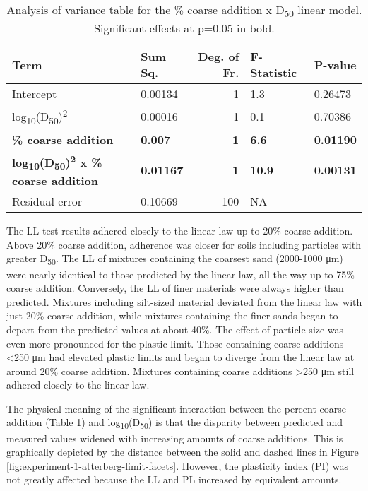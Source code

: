 \documentclass[
  letterpaper,
]{article}
\begin{document}
\begin{table}

\caption{\label{tab:experiment-1-d50-ANOVA}Analysis of variance table for the \% coarse addition x D\textsubscript{50} linear model. Significant effects at p=0.05 in bold.}
\centering
\begin{tabular}[t]{llrll}
\toprule
\textbf{Term} & \textbf{Sum Sq.} & \textbf{Deg. of Fr.} & \textbf{F-Statistic} & \textbf{P-value}\\
\midrule
Intercept & 0.00134 & 1 & 1.3 & 0.26473\\
log\textsubscript{10}(D\textsubscript{50})\textsuperscript{2} & 0.00016 & 1 & 0.1 & 0.70386\\
\textbf{\% coarse addition} & \textbf{0.007} & \textbf{1} & \textbf{6.6} & \textbf{0.01190}\\
\textbf{log\textsubscript{10}(D\textsubscript{50})\textsuperscript{2} x \% coarse addition} & \textbf{0.01167} & \textbf{1} & \textbf{10.9} & \textbf{0.00131}\\
Residual error & 0.10669 & 100 & NA & -\\
\bottomrule
\end{tabular}
\end{table}

The LL test results adhered closely to the linear law up to 20\% coarse addition.
Above 20\% coarse addition, adherence was closer for soils including particles with greater D\textsubscript{50}.
The LL of mixtures containing the coarsest sand (2000-1000 μm) were nearly identical to those predicted by the linear law, all the way up to 75\% coarse addition.
Conversely, the LL of finer materials were always higher than predicted.
Mixtures including silt-sized material deviated from the linear law with just 20\% coarse addition, while mixtures containing the finer sands began to depart from the predicted values at about 40\%.
The effect of particle size was even more pronounced for the plastic limit.
Those containing coarse additions \textless250 μm had elevated plastic limits and began to diverge from the linear law at around 20\% coarse addition. Mixtures containing coarse additions \textgreater250 μm still adhered closely to the linear law.

The physical meaning of the significant interaction between the percent coarse addition (Table \ref{tab:experiment-1-d50-ANOVA}) and log\textsubscript{10}(D\textsubscript{50}) is that the disparity between predicted and measured values widened with increasing amounts of coarse additions.
This is graphically depicted by the distance between the solid and dashed lines in Figure \ref{fig:experiment-1-atterberg-limit-facets}.
However, the plasticity index (PI) was not greatly affected because the LL and PL increased by equivalent amounts.
\end{document}

